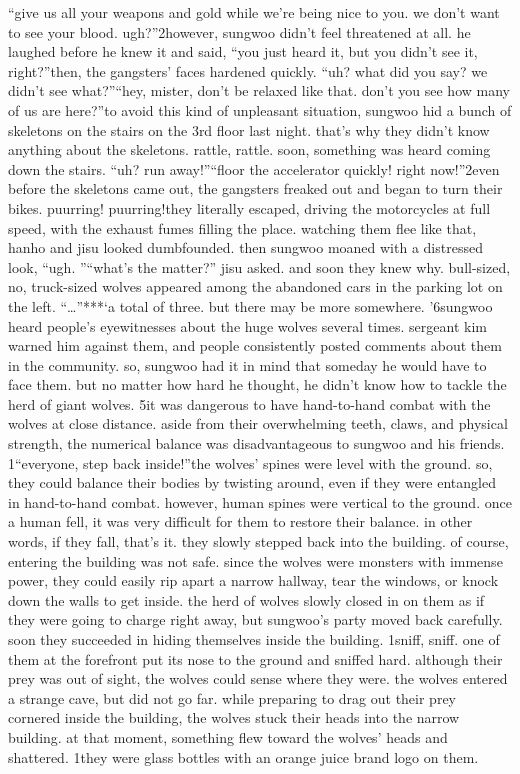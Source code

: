 “give us all your weapons and gold while we’re being nice to you.
 we don’t want to see your blood.
 ugh?”2however, sungwoo didn’t feel threatened at all.
 he laughed before he knew it and said, “you just heard it, but you didn’t see it, right?”then, the gangsters’ faces hardened quickly.
“uh? what did you say? we didn’t see what?”“hey, mister, don’t be relaxed like that.
 don’t you see how many of us are here?”to avoid this kind of unpleasant situation, sungwoo hid a bunch of skeletons on the stairs on the 3rd floor last night.
 that’s why they didn’t know anything about the skeletons.
rattle, rattle.
soon, something was heard coming down the stairs.
“uh? run away!”“floor the accelerator quickly! right now!”2even before the skeletons came out, the gangsters freaked out and began to turn their bikes.
puurring! puurring!they literally escaped, driving the motorcycles at full speed, with the exhaust fumes filling the place.
 watching them flee like that, hanho and jisu looked dumbfounded.
then sungwoo moaned with a distressed look, “ugh.
”“what’s the matter?” jisu asked.
and soon they knew why.
bull-sized, no, truck-sized wolves appeared among the abandoned cars in the parking lot on the left.
“…”***‘a total of three.
 but there may be more somewhere.
’6sungwoo heard people’s eyewitnesses about the huge wolves several times.
 sergeant kim warned him against them, and people consistently posted comments about them in the community.
so, sungwoo had it in mind that someday he would have to face them.
but no matter how hard he thought, he didn’t know how to tackle the herd of giant wolves.
5it was dangerous to have hand-to-hand combat with the wolves at close distance.
 aside from their overwhelming teeth, claws, and physical strength, the numerical balance was disadvantageous to sungwoo and his friends.
1“everyone, step back inside!”the wolves’ spines were level with the ground.
 so, they could balance their bodies by twisting around, even if they were entangled in hand-to-hand combat.
 however, human spines were vertical to the ground.
 once a human fell, it was very difficult for them to restore their balance.
 in other words, if they fall, that’s it.
they slowly stepped back into the building.
 of course, entering the building was not safe.
since the wolves were monsters with immense power, they could easily rip apart a narrow hallway, tear the windows, or knock down the walls to get inside.
the herd of wolves slowly closed in on them as if they were going to charge right away, but sungwoo’s party moved back carefully.
 soon they succeeded in hiding themselves inside the building.
1sniff, sniff.
one of them at the forefront put its nose to the ground and sniffed hard.
although their prey was out of sight, the wolves could sense where they were.
the wolves entered a strange cave, but did not go far.
 while preparing to drag out their prey cornered inside the building, the wolves stuck their heads into the narrow building.
at that moment, something flew toward the wolves’ heads and shattered.
1they were glass bottles with an orange juice brand logo on them.


